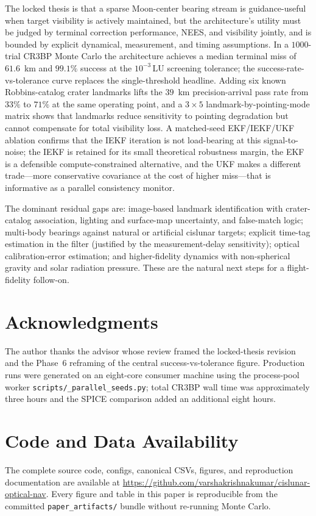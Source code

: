 \documentclass[10pt,twocolumn]{article}
\newcommand{\LU}{\mathrm{LU}}
\begin{document}
The locked thesis is that a sparse Moon-center bearing stream is guidance-useful when target visibility is actively maintained, but the architecture's utility must be judged by terminal correction performance, NEES, and visibility jointly, and is bounded by explicit dynamical, measurement, and timing assumptions.  In a $1000$-trial CR3BP Monte Carlo the architecture achieves a median terminal miss of $61.6$~km and $99.1\%$ success at the $10^{-3}\,\LU$ screening tolerance; the success-rate-vs-tolerance curve replaces the single-threshold headline.  Adding six known Robbins-catalog crater landmarks lifts the $39$~km precision-arrival pass rate from $33\%$ to $71\%$ at the same operating point, and a $3\times 5$ landmark-by-pointing-mode matrix shows that landmarks reduce sensitivity to pointing degradation but cannot compensate for total visibility loss.  A matched-seed EKF/IEKF/UKF ablation confirms that the IEKF iteration is not load-bearing at this signal-to-noise; the IEKF is retained for its small theoretical robustness margin, the EKF is a defensible compute-constrained alternative, and the UKF makes a different trade---more conservative covariance at the cost of higher miss---that is informative as a parallel consistency monitor.

The dominant residual gaps are: image-based landmark identification with crater-catalog association, lighting and surface-map uncertainty, and false-match logic; multi-body bearings against natural or artificial cislunar targets; explicit time-tag estimation in the filter (justified by the measurement-delay sensitivity); optical calibration-error estimation; and higher-fidelity dynamics with non-spherical gravity and solar radiation pressure.  These are the natural next steps for a flight-fidelity follow-on.

\section*{Acknowledgments}
The author thanks the advisor whose review framed the locked-thesis revision and the Phase~6 reframing of the central success-vs-tolerance figure.  Production runs were generated on an eight-core consumer machine using the process-pool worker \texttt{scripts/\_parallel\_seeds.py}; total CR3BP wall time was approximately three hours and the SPICE comparison added an additional eight hours.

\section*{Code and Data Availability}
The complete source code, configs, canonical CSVs, figures, and reproduction documentation are available at \url{https://github.com/varshakrishnakumar/cislunar-optical-nav}.  Every figure and table in this paper is reproducible from the committed \texttt{paper\_artifacts/} bundle without re-running Monte Carlo.
\end{document}
